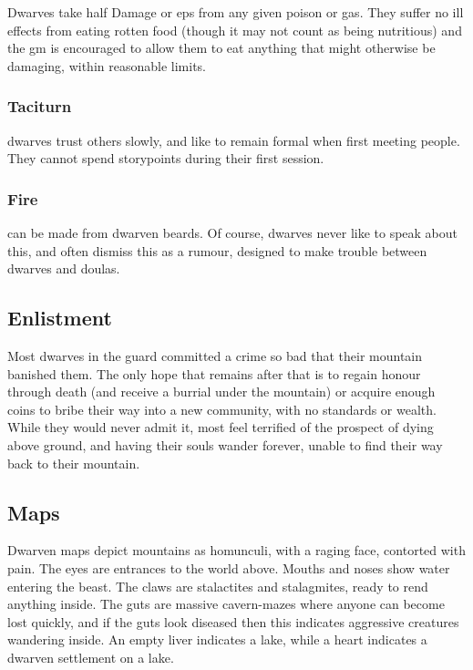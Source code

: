 Dwarves take half Damage or \glspl{ep} from any given poison or gas.
They suffer no ill effects from eating rotten food (though it may not count as being nutritious) and the \gls{gm} is encouraged to allow them to eat anything that might otherwise be damaging, within reasonable limits.

\subsubsection{Taciturn}
dwarves trust others slowly, and like to remain formal when first meeting people.
They cannot spend \glspl{storypoint} during their first session.

\subsubsection{Fire }
can be made from dwarven beards.
Of course, dwarves never like to speak about this, and often dismiss this as a rumour, designed to make trouble between dwarves and \glspl{doula}.

\subsection{Enlistment}

Most dwarves in the \gls{guard} committed a crime so bad that their mountain banished them.
The only hope that remains after that is to regain honour through death (and receive a burrial under the mountain) or acquire enough \glspl{coin} to bribe their way into a new community, with no standards or wealth.
While they would never admit it, most feel terrified of the prospect of dying above ground, and having their souls wander forever, unable to find their way back to their mountain.

\subsection{Maps}

Dwarven maps depict mountains as homunculi, with a raging face, contorted with pain.
The eyes are entrances to the world above.
Mouths and noses show water entering the beast.
The claws are stalactites and stalagmites, ready to rend anything inside.
The guts are massive cavern-mazes where anyone can become lost quickly, and if the guts look diseased then this indicates aggressive creatures wandering inside.
An empty liver indicates a lake, while a heart indicates a dwarven settlement on a lake.

